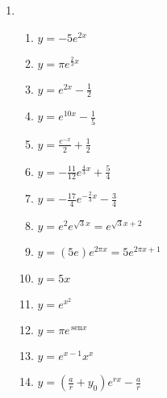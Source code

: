 \documentclass[a4paper]{article}
\providecommand{\sin}{} \renewcommand{\sin}{\hspace{2pt}\mathrm{sen}}
\begin{document}
\begin{enumerate}
\item %
  \begin{enumerate}
  \item $y = -5e^{2x}$ %
  \item $y = \pi e^{\frac{2}{3}x}$ %
  \item $y = e^{2x} - \frac{1}{2}$ %
  \item $y = e^{10x} - \frac{1}{5}$ %
  \item $y = \frac{e^{-x}}{2} + \frac{1}{2}$ %
  \item $y = -\frac{11}{12}e^{\frac{4}{3}x} + \frac{5}{4}$ %
  \item $y = -\frac{17}{4}e^{-\frac{2}{3}x} - \frac{3}{4}$ %
  \item $y = e^2e^{\sqrt{3}x}=e^{\sqrt{3}x+2}$ %
  \item $y = (5e) e^{2\pi x} = 5e^{2\pi x +1}$ %
  \item $y = 5x$ %
  \item $y = e^{x^2}$ %
  \item $y = \pi e^{\sin x}$ %
  \item $y = e^{x-1} x^x$ %
  \item $y = (\frac{a}{r} + y_0)e^{rx} - \frac{a}{r}$ %
  \end{enumerate}


\end{enumerate}
\end{document}
